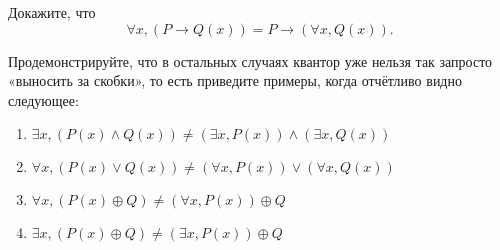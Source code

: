 \begin{exercise}
Докажите, что $$\forall x, (P\to Q(x)) = P\to (\forall x, Q(x)).$$
\end{exercise}

\begin{exercise}Продемонстрируйте, что в остальных случаях квантор уже нельзя так запросто «выносить за скобки», то есть приведите примеры, когда отчётливо видно следующее:
\begin{enumerate}
\item   $\exists x,(P(x)\wedge Q(x))\not=(\exists x, P(x))\wedge (\exists x,Q(x))$
\item   $\forall x, (P(x) \vee Q(x)) \not= (\forall x, P(x))\vee (\forall x, Q(x))$
\item   $\forall x, (P(x) \oplus Q) \not= (\forall x, P(x))\oplus Q$
\item   $\exists x, (P(x) \oplus Q) \not= (\exists x, P(x))\oplus Q$
\end{enumerate}
\end{exercise}
